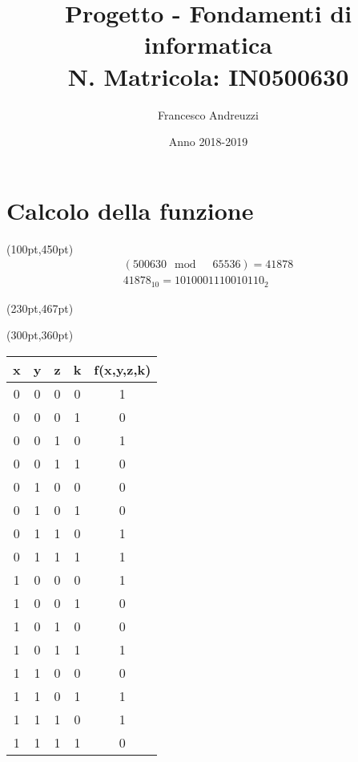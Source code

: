 \documentclass{article}
\begin{document}
\author{Francesco Andreuzzi}
\title{Progetto - Fondamenti di informatica\\ \large{N. Matricola: IN0500630}}
\date{Anno 2018-2019}
\maketitle

\section{Calcolo della funzione}

\begin{textblock*}{10pt}(100pt,450pt)
  \begin{gather*}
    (500630 \mod \quad 65536) = 41878\\
    41878_{10} = 1010001110010110_2
  \end{gather*}
\end{textblock*}

\begin{textblock*}{10pt}(230pt,467pt)
  \Huge{\boldmath{$\implies$}}
\end{textblock*}

\begin{textblock*}{10pt}(300pt,360pt)
  \begin{tabular}{|c|c|c|c|c|}
    \hline
    \textbf{x} & \textbf{y} & \textbf{z} & \textbf{k} & \textbf{f(x,y,z,k)} \\
    \hline
      0 & 0 & 0 & 0 & 1 \\
    \hline
      0 & 0 & 0 & 1 & 0 \\
    \hline
      0 & 0 & 1 & 0 & 1 \\
    \hline
      0 & 0 & 1 & 1 & 0 \\
    \hline
      0 & 1 & 0 & 0 & 0 \\
    \hline
      0 & 1 & 0 & 1 & 0 \\
    \hline
      0 & 1 & 1 & 0 & 1 \\
    \hline
      0 & 1 & 1 & 1 & 1 \\
    \hline
      1 & 0 & 0 & 0 & 1 \\
    \hline
      1 & 0 & 0 & 1 & 0 \\
    \hline
      1 & 0 & 1 & 0 & 0 \\
    \hline
      1 & 0 & 1 & 1 & 1 \\
    \hline
      1 & 1 & 0 & 0 & 0 \\
    \hline
      1 & 1 & 0 & 1 & 1 \\
    \hline
      1 & 1 & 1 & 0 & 1 \\
    \hline
      1 & 1 & 1 & 1 & 0 \\
    \hline
  \end{tabular}
\end{textblock*}
\end{document}
